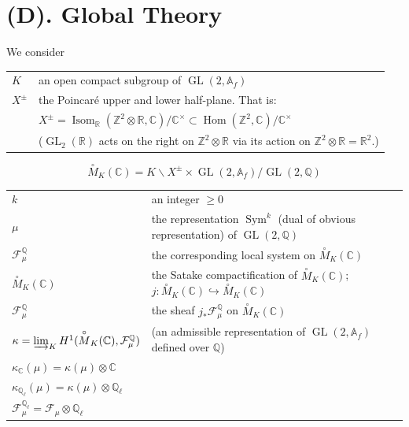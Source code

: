 \documentclass[11pt,a4paper]{article}
\theoremstyle{plain}
\theoremstyle{definition}
\theoremstyle{remark}
\DeclareMathOperator{\Hom}{Hom}
\DeclareMathOperator{\Isom}{Isom}
\DeclareMathOperator{\GL}{GL}
\DeclareMathOperator{\Sym}{Sym}
\newcommand{\C}{\mathbb{C}}
\newcommand{\Q}{\mathbb{Q}}
\newcommand{\R}{\mathbb{R}}
\newcommand{\Z}{\mathbb{Z}}
\newcommand{\Af}{\mathbb{A}_{f}}
\newcommand{\Ql}{\mathbb{Q}_{\ell}}
\begin{document}
\section*{(D). Global Theory}

We consider
\begin{center}
\begin{tabular}{@{}ll@{}}
$K$ & an open compact subgroup of $\GL(2, \Af)$ \\
$X^{\pm}$ & the Poincar\'e upper and lower half-plane. That is: \\
& $X^{\pm} = \Isom_{\R}(\Z^{2} \otimes \R, \C)/\C^{\times} \subset \Hom(\Z^{2}, \C)/\C^{\times}$ \\
& ($\GL_{2}(\R)$ acts on the right on $\Z^{2} \otimes \R$ via its action on $\Z^{2} \otimes \R = \R^{2}$.)
\end{tabular}
\end{center}
\[
\overset{\circ}{M}_{K}(\C) = K \backslash X^{\pm} \times \GL(2, \Af)/\GL(2, \Q)
\]
\begin{center}
\begin{tabular}{@{}ll@{}}
$k$ & an integer $\geq 0$ \\
$\mu$ & the representation $\Sym^{k}$ (dual of obvious representation) of $\GL(2, \Q)$ \\
$\mathcal{F}_{\mu}^{\Q}$ & the corresponding local system on $\overset{\circ}{M}_{K}(\C)$ \\
$\overset{\circ}{M}_{K}(\C)$ & the Satake compactification of $\overset{\circ}{M}_{K}(\C)$; $j : \overset{\circ}{M}_{K}(\C) \hookrightarrow \overset{\circ}{M}_{K}(\C)$ \\
$\mathcal{F}_{\mu}^{\Q}$ & the sheaf $j_{*} \mathcal{F}_{\mu}^{\Q}$ on $\overset{\circ}{M}_{K}(\C)$ \\
$\kappa = \varinjlim_{K} H^{1}(\overset{\circ}{M}_{K}(\C), \mathcal{F}_{\mu}^{\Q})$ & (an admissible representation of $\GL(2, \Af)$ defined over $\Q$) \\
$\kappa_{\C}(\mu) = \kappa(\mu) \otimes \C$ & \\
$\kappa_{\Ql}(\mu) = \kappa(\mu) \otimes \Ql$ & \\
$\mathcal{F}_{\mu}^{\Ql} = \mathcal{F}_{\mu} \otimes \Ql$ &
\end{tabular}
\end{center}
\end{document}
